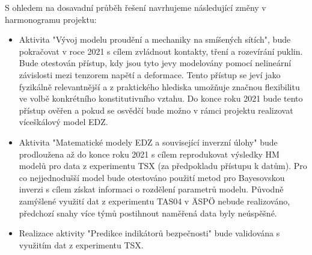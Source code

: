 \documentclass[11pt,a4paper]{article}
\begin{document}
\begin{onehalfspacing}
S ohledem na dosavadní průběh řešení navrhujeme následující změny v harmonogramu projektu:
\begin{itemize}
    \item Aktivita "Vývoj modelu proudění a mechaniky na smíšených sítích", bude pokračovat v roce 2021 s cílem 
zvládnout kontakty, tření a rozevírání puklin. Bude otestován přístup, kdy jsou tyto jevy modelovány pomocí 
nelineární závislosti mezi tenzorem napětí a deformace. Tento přístup se jeví jako fyzikálně relevantnější a z praktického 
hlediska umožňuje značnou flexibilitu ve volbě konkrétního konstitutivního vztahu. Do konce roku 2021 bude tento přístup ověřen
a pokud se osvědčí bude možno v rámci projektu realizovat víceškálový model EDZ.
    \item Aktivita "Matematické modely EDZ a související inverzní úlohy" bude prodloužena až do konce roku 2021 s 
    cílem reprodukovat výsledky HM modelů pro data z experimentu TSX (za předpokladu přístupu k datům). Pro co nejjednodušší 
    model bude otestováno použití metod pro Bayesovskou inverzi s cílem získat informaci o rozdělení parametrů modelu. Původně zamýšlené využití dat z experimentu TAS04 v \"ASP\"O nebude realizováno, předchozí snahy více týmů postihnout naměřená data byly neúspěšné.  
    \item Realizace aktivity "Predikce indikátorů bezpečnosti" bude validována s využitím dat z experimentu TSX.
\end{itemize}



%





\end{onehalfspacing}
\end{document}
